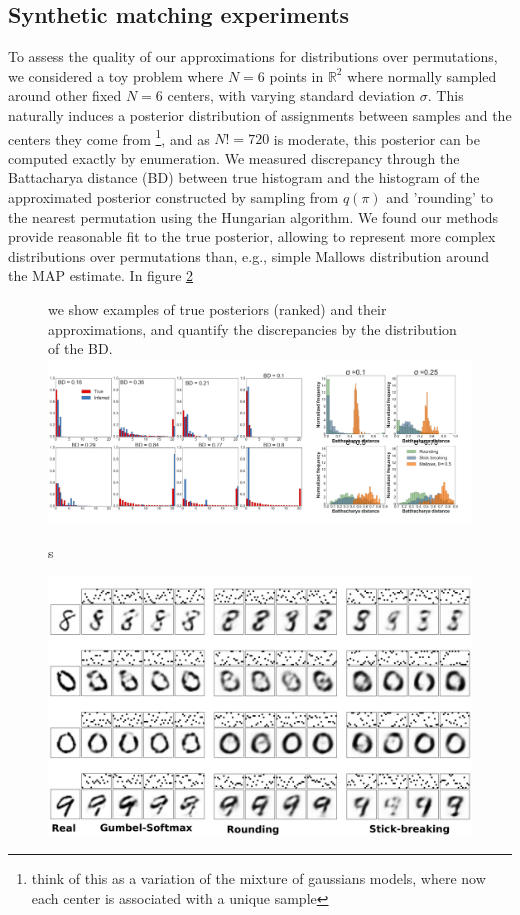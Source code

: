 \documentclass{article}
\begin{document}
 \subsection{Synthetic matching experiments}
To assess the quality of our approximations for distributions over permutations, we considered a toy problem where $N=6$ points in $\mathbb{R}^2$ where normally sampled around other fixed $N=6$ centers, with varying standard deviation $\sigma$. This naturally induces a posterior distribution of assignments between samples and the centers they come from \footnote{think of this as a variation of the mixture of gaussians models, where now each center is associated with a unique sample}, and as $N!=720$ is moderate, this posterior can be computed exactly by enumeration. We measured discrepancy through the Battacharya distance (BD) between true histogram and the histogram of the approximated posterior constructed by sampling from $q(\pi)$ and 'rounding' to the nearest permutation using the Hungarian algorithm. We found our methods provide reasonable fit to the true posterior, allowing to represent more complex distributions over permutations than, e.g., simple Mallows distribution around the MAP estimate. In figure \ref{fig:synthetic}\begin{figure}[t] we show examples of true posteriors (ranked) and their approximations, and quantify the discrepancies by the distribution of the BD.
  \centering
  \includegraphics[width=1.0\textwidth]{../figures/figure5.pdf} 
  \caption{s
  }
\label{fig:VAE}
\end{figure}

\label{sub:synthetic}


\begin{figure}[t]
  \centering
  \includegraphics[width=5.in]{../figures/figure4.pdf} 
  \caption{
  }
\label{fig:synthetic}
\end{figure}
\end{document}
